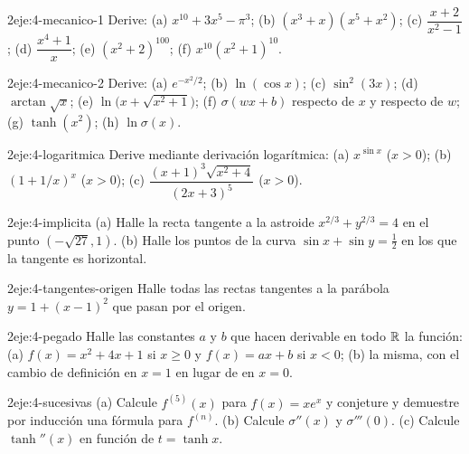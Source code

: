 \begin{ejercicio}{2}{eje:4-mecanico-1}
Derive: (a) $x^{10}+3x^{5}-\pi^{3}$; (b) $(x^{3}+x)(x^{5}+x^{2})$; (c) $\dfrac{x+2}{x^{2}-1}$; (d) $\dfrac{x^{4}+1}{x}$; (e) $(x^{2}+2)^{100}$; (f) $x^{10}(x^{2}+1)^{10}$.
\end{ejercicio}

\begin{ejercicio}{2}{eje:4-mecanico-2}
Derive: (a) $e^{-x^{2}/2}$; (b) $\ln(\cos x)$; (c) $\sin^{2}(3x)$; (d) $\arctan\sqrt{x}$; (e) $\ln\bigl(x+\sqrt{x^{2}+1}\bigr)$; (f) $\sigma(wx+b)$ respecto de $x$ y respecto de $w$; (g) $\tanh(x^{2})$; (h) $\ln\sigma(x)$.
\end{ejercicio}

\begin{ejercicio}{2}{eje:4-logaritmica}
Derive mediante derivación logarítmica: (a) $x^{\sin x}$ ($x>0$); (b) $(1+1/x)^{x}$ ($x>0$); (c) $\dfrac{(x+1)^{3}\sqrt{x^{2}+4}}{(2x+3)^{5}}$ ($x>0$).
\end{ejercicio}

\begin{ejercicio}{2}{eje:4-implicita}
(a) Halle la recta tangente a la astroide $x^{2/3}+y^{2/3}=4$ en el punto $(-\sqrt{27},1)$. (b) Halle los puntos de la curva $\sin x+\sin y=\tfrac12$ en los que la tangente es horizontal.
\end{ejercicio}

\begin{ejercicio}{2}{eje:4-tangentes-origen}
Halle todas las rectas tangentes a la parábola $y=1+(x-1)^{2}$ que pasan por el origen.
\end{ejercicio}

\begin{ejercicio}{2}{eje:4-pegado}
Halle las constantes $a$ y $b$ que hacen derivable en todo $\mathbb{R}$ la función: (a) $f(x)=x^{2}+4x+1$ si $x\ge0$ y $f(x)=ax+b$ si $x<0$; (b) la misma, con el cambio de definición en $x=1$ en lugar de en $x=0$.
\end{ejercicio}

\begin{ejercicio}{2}{eje:4-sucesivas}
(a) Calcule $f^{(5)}(x)$ para $f(x)=xe^{x}$ y conjeture y demuestre por inducción una fórmula para $f^{(n)}$. (b) Calcule $\sigma''(x)$ y $\sigma'''(0)$. (c) Calcule $\tanh''(x)$ en función de $t=\tanh x$.
\end{ejercicio}

